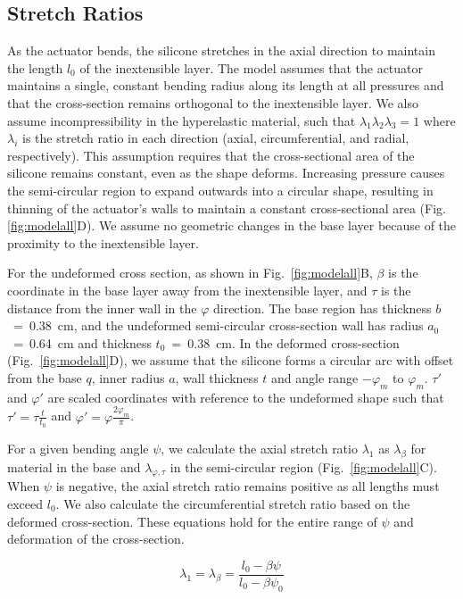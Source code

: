 \clearpage
\subsection{Stretch Ratios}

As the actuator bends, the silicone stretches in the axial direction to maintain the length $l_0$ of the inextensible layer. The model assumes that the actuator maintains a single, constant bending radius along its length at all pressures and that the cross-section remains orthogonal to the inextensible layer. We also assume incompressibility in the hyperelastic material, such that $\lambda_{1}\lambda_{2}\lambda_{3} = 1$ where $\lambda_i$ is the stretch ratio in each direction (axial, circumferential, and radial, respectively). This assumption requires that the cross-sectional area of the silicone remains constant, even as the shape deforms. Increasing pressure causes the semi-circular region to expand outwards into a circular shape, resulting in thinning of the actuator's walls to maintain a constant cross-sectional area (Fig. \ref{fig:modelall}D). We assume no geometric changes in the base layer because of the proximity to the inextensible layer.

For the undeformed cross section, as shown in Fig.~\ref{fig:modelall}B, $\beta$ is the coordinate in the base layer away from the inextensible layer, and $\tau$ is the distance from the inner wall in the $\varphi$ direction. The base region has thickness $b$~=~0.38~cm, and the undeformed semi-circular cross-section wall has radius $a_0$~=~0.64~cm and thickness $t_0$~=~0.38~cm. In the deformed cross-section (Fig.~\ref{fig:modelall}D), we assume that the silicone forms a circular arc with offset from the base $q$, inner radius $a$, wall thickness $t$ and angle range $-\varphi_m$ to $\varphi_m$. $\tau'$ and $\varphi'$ are scaled coordinates with reference to the undeformed shape such that $\tau'=\tau\frac{t}{t_0}$ and $\varphi'=\varphi\frac{2\varphi_m}{\pi}$.

For a given bending angle $\psi$, we calculate the axial stretch ratio $\lambda_1$ as $\lambda_{\beta}$ for material in the base and $\lambda_{\varphi,\tau}$ in the semi-circular region (Fig.~\ref{fig:modelall}C). When $\psi$ is negative, the axial stretch ratio remains positive as all lengths must exceed $l_0$. We also calculate the circumferential stretch ratio based on the deformed cross-section. These equations hold for the entire range of $\psi$ and deformation of the cross-section. 

\begin{equation}
    \lambda_1=\lambda_{\beta} = \frac{l_{0} - \beta \psi}{l_{0}-\beta\psi_0} 
    \label{eq:stretchbeta}
\end{equation}

